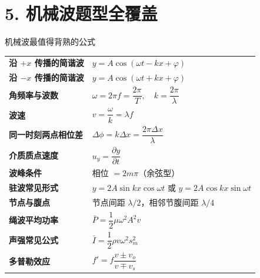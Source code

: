 \documentclass[11pt,a4paper]{ctexart}
\begin{document}
\section*{5. 机械波题型全覆盖}

\begin{introbox}{机械波最值得背熟的公式}
\begin{tabularx}{\textwidth}{>{\bfseries}p{4.0cm}X}
沿 \(+x\) 传播的简谐波 & \(y=A\cos(\omega t-kx+\varphi)\) \\[2pt]
沿 \(-x\) 传播的简谐波 & \(y=A\cos(\omega t+kx+\varphi)\) \\[2pt]
角频率与波数 & \(\omega=2\pi f=\dfrac{2\pi}{T},\quad k=\dfrac{2\pi}{\lambda}\) \\[2pt]
波速 & \(v=\dfrac{\omega}{k}=\lambda f\) \\[2pt]
同一时刻两点相位差 & \(\Delta\phi=k\Delta x=\dfrac{2\pi\Delta x}{\lambda}\) \\[2pt]
介质质点速度 & \(u_y=\dfrac{\partial y}{\partial t}\) \\[2pt]
波峰条件 & 相位 \(=2m\pi\)（余弦型） \\[2pt]
驻波常见形式 & \(y=2A\sin kx \cos\omega t\) 或 \(y=2A\cos kx \sin\omega t\) \\[2pt]
节点与腹点 & 节点间距 \(\lambda/2\)，相邻节腹间距 \(\lambda/4\) \\[2pt]
绳波平均功率 & \(\bar P=\dfrac12\mu\omega^2A^2v\) \\[2pt]
声强常见公式 & \(\bar I=\dfrac12\rho v\omega^2 s_m^2\) \\[2pt]
多普勒效应 & \(f'=f\dfrac{v\pm v_o}{v\mp v_s}\)
\end{tabularx}
\end{introbox}

\begin{center}
\end{center}
\end{document}
